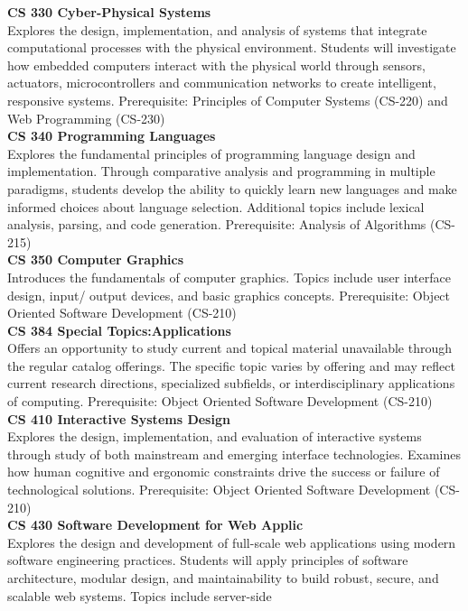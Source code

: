 \documentclass[
  letterpaper,
]{scrbook}
\begin{document}
\textbf{CS 330 Cyber-Physical Systems}\\
Explores the design, implementation, and analysis of systems that
integrate computational processes with the physical environment.
Students will investigate how embedded computers interact with the
physical world through sensors, actuators, microcontrollers and
communication networks to create intelligent, responsive systems.
Prerequisite: Principles of Computer Systems (CS-220) and Web
Programming (CS-230)\\
\textbf{CS 340 Programming Languages}\\
Explores the fundamental principles of programming language design and
implementation. Through comparative analysis and programming in multiple
paradigms, students develop the ability to quickly learn new languages
and make informed choices about language selection. Additional topics
include lexical analysis, parsing, and code generation. Prerequisite:
Analysis of Algorithms (CS-215)\\
\textbf{CS 350 Computer Graphics}\\
Introduces the fundamentals of computer graphics. Topics include user
interface design, input/ output devices, and basic graphics concepts.
Prerequisite: Object Oriented Software Development (CS-210)\\
\textbf{CS 384 Special Topics:Applications}\\
Offers an opportunity to study current and topical material unavailable
through the regular catalog offerings. The specific topic varies by
offering and may reflect current research directions, specialized
subfields, or interdisciplinary applications of computing. Prerequisite:
Object Oriented Software Development (CS-210)\\
\textbf{CS 410 Interactive Systems Design}\\
Explores the design, implementation, and evaluation of interactive
systems through study of both mainstream and emerging interface
technologies. Examines how human cognitive and ergonomic constraints
drive the success or failure of technological solutions. Prerequisite:
Object Oriented Software Development (CS-210)\\
\textbf{CS 430 Software Development for Web Applic}\\
Explores the design and development of full-scale web applications using
modern software engineering practices. Students will apply principles of
software architecture, modular design, and maintainability to build
robust, secure, and scalable web systems. Topics include server-side
\end{document}
